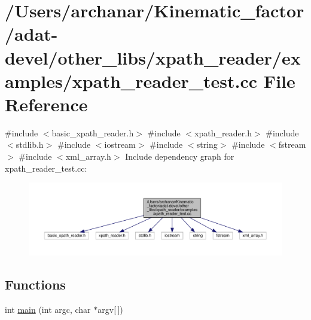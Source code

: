 \hypertarget{adat-devel_2other__libs_2xpath__reader_2examples_2xpath__reader__test_8cc}{}\section{/\+Users/archanar/\+Kinematic\+\_\+factor/adat-\/devel/other\+\_\+libs/xpath\+\_\+reader/examples/xpath\+\_\+reader\+\_\+test.cc File Reference}
\label{adat-devel_2other__libs_2xpath__reader_2examples_2xpath__reader__test_8cc}
{\ttfamily \#include $<$basic\+\_\+xpath\+\_\+reader.\+h$>$}\newline
{\ttfamily \#include $<$xpath\+\_\+reader.\+h$>$}\newline
{\ttfamily \#include $<$stdlib.\+h$>$}\newline
{\ttfamily \#include $<$iostream$>$}\newline
{\ttfamily \#include $<$string$>$}\newline
{\ttfamily \#include $<$fstream$>$}\newline
{\ttfamily \#include $<$xml\+\_\+array.\+h$>$}\newline
Include dependency graph for xpath\+\_\+reader\+\_\+test.\+cc\+:
\nopagebreak
\begin{figure}[H]
\begin{center}
\leavevmode
\includegraphics[width=350pt]{d5/d59/adat-devel_2other__libs_2xpath__reader_2examples_2xpath__reader__test_8cc__incl}
\end{center}
\end{figure}
\subsection*{Functions}
\begin{DoxyCompactItemize}
\item 
int \mbox{\hyperlink{adat-devel_2other__libs_2xpath__reader_2examples_2xpath__reader__test_8cc_a0ddf1224851353fc92bfbff6f499fa97}{main}} (int argc, char $\ast$argv\mbox{[}$\,$\mbox{]})
\end{DoxyCompactItemize}


